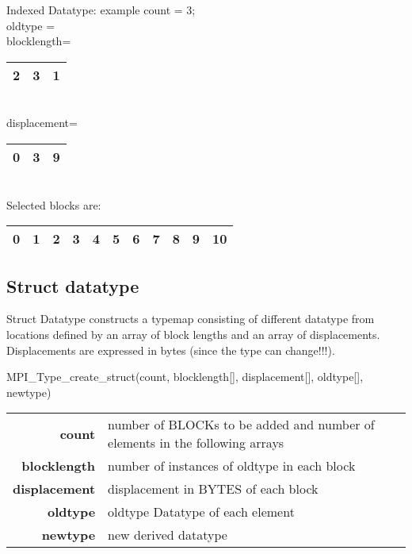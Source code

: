 \documentclass[aspectratio=43]{beamer}
\begin{document}
\begin{frame}[fragile]{Indexed Datatype: example}
count = 3;\\
oldtype = \\
blocklength=
\begin{tabular}{|c|c|c|}
\hline
2  & 3  & 1 \\
\hline
\end{tabular}\\
displacement=
\begin{tabular}{|c|c|c|}
\hline
0  & 3  & 9 \\
\hline
\end{tabular}\\[0.5cm]

Selected blocks are:
\begin{tabular}{|c|c|c|c|c|c|c|c|c|c|c|}
\hline
\color{cscsred}0  & \color{cscsred}1  & 2 & \color{cscsred}3 & \color{cscsred}4 & \color{cscsred}5 & 6 & 7 & 8 & \color{cscsred}9 & 10\\
\hline
\end{tabular}
\end{frame}


\subsection{Struct datatype}
\begin{frame}[fragile]{Struct Datatype}
 constructs a typemap consisting of different datatype from locations defined by an array of block lengths and an array of displacements.
Displacements are expressed in bytes (since the type can change!!!).
\begin{Pseudolisting}[]{}
MPI_Type_create_struct(count, blocklength[], displacement[], 
                       oldtype[], newtype)
\end{Pseudolisting}
\begin{black1block}{}
\begin{tabular}{rp{6.4cm}}
\textbf{count} & number of BLOCKs to be added and number of elements in the following arrays\\
\textbf{blocklength} & number of instances of oldtype in each block\\
\textbf{displacement} & displacement in BYTES of each block\\
\textbf{oldtype} & oldtype Datatype of each element\\
\textbf{newtype} & new derived datatype\\
\end{tabular}
\end{black1block}
\end{frame}
\end{document}
